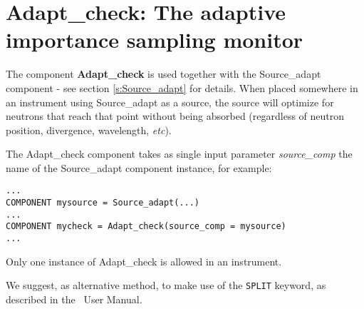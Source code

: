 \section{Adapt\_check: The adaptive importance sampling monitor}
\label{s:adapt_check}


The component {\bf Adapt\_check} is used together with the Source\_adapt component - see section \ref{s:Source_adapt} for details. When placed somewhere in an instrument using Source\_adapt as a source, the source will optimize for neutrons that reach that point without being absorbed (regardless of neutron position, divergence, wavelength, \emph{etc}).

The Adapt\_check component takes as single input parameter \emph{source\_comp} the name of the Source\_adapt component instance, for example:

\begin{lstlisting}
...
COMPONENT mysource = Source_adapt(...)
...
COMPONENT mycheck = Adapt_check(source_comp = mysource)
...
\end{lstlisting}

Only one instance of Adapt\_check is allowed in an instrument.

We suggest, as alternative method, to make use of the \texttt{SPLIT} keyword, as described in the \MCS\ User Manual.
